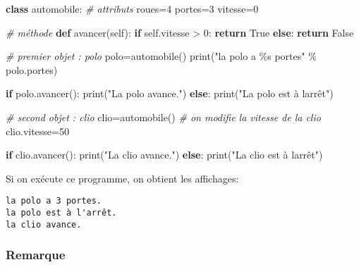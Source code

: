\documentclass[11pt]{article}
\newenvironment{Shaded}{}{}
\newcommand{\KeywordTok}[1]{\textcolor[rgb]{0.00,0.44,0.13}{\textbf{{#1}}}}
\newcommand{\DecValTok}[1]{\textcolor[rgb]{0.25,0.63,0.44}{{#1}}}
\newcommand{\StringTok}[1]{\textcolor[rgb]{0.25,0.44,0.63}{{#1}}}
\newcommand{\CommentTok}[1]{\textcolor[rgb]{0.38,0.63,0.69}{\textit{{#1}}}}
\newcommand{\NormalTok}[1]{{#1}}
\newcommand{\SpecialCharTok}[1]{\textcolor[rgb]{0.25,0.44,0.63}{{#1}}}
\newcommand{\VariableTok}[1]{\textcolor[rgb]{0.10,0.09,0.49}{{#1}}}
\newcommand{\ControlFlowTok}[1]{\textcolor[rgb]{0.00,0.44,0.13}{\textbf{{#1}}}}
\newcommand{\OperatorTok}[1]{\textcolor[rgb]{0.40,0.40,0.40}{{#1}}}
\newcommand{\BuiltInTok}[1]{{#1}}
\begin{document}
\begin{Shaded}
\begin{Highlighting}[]
\KeywordTok{class}\NormalTok{ automobile:}
    \CommentTok{\# attributs}
\NormalTok{    roues}\OperatorTok{=}\DecValTok{4}
\NormalTok{    portes}\OperatorTok{=}\DecValTok{3}
\NormalTok{    vitesse}\OperatorTok{=}\DecValTok{0}
    
    \CommentTok{\# méthode}
    \KeywordTok{def}\NormalTok{ avancer(}\VariableTok{self}\NormalTok{):}
        \ControlFlowTok{if} \VariableTok{self}\NormalTok{.vitesse }\OperatorTok{\textgreater{}} \DecValTok{0}\NormalTok{:}
            \ControlFlowTok{return} \VariableTok{True}
        \ControlFlowTok{else}\NormalTok{:}
            \ControlFlowTok{return} \VariableTok{False}

\CommentTok{\# premier objet : polo}
\NormalTok{polo}\OperatorTok{=}\NormalTok{automobile()}
\BuiltInTok{print}\NormalTok{(}\StringTok{"la polo a }\SpecialCharTok{\%s}\StringTok{ portes"} \OperatorTok{\%}\NormalTok{ polo.portes)}

\ControlFlowTok{if}\NormalTok{ polo.avancer():}
    \BuiltInTok{print}\NormalTok{(}\StringTok{"La polo avance."}\NormalTok{)}
\ControlFlowTok{else}\NormalTok{:}
    \BuiltInTok{print}\NormalTok{(}\StringTok{"La polo est à l\textquotesingle{}arrêt"}\NormalTok{)}

\CommentTok{\# second objet : clio}
\NormalTok{clio}\OperatorTok{=}\NormalTok{automobile()}
\CommentTok{\# on modifie la vitesse de la clio}
\NormalTok{clio.vitesse}\OperatorTok{=}\DecValTok{50}

\ControlFlowTok{if}\NormalTok{ clio.avancer():}
    \BuiltInTok{print}\NormalTok{(}\StringTok{"La clio avance."}\NormalTok{)}
\ControlFlowTok{else}\NormalTok{:}
    \BuiltInTok{print}\NormalTok{(}\StringTok{"La clio est à l\textquotesingle{}arrêt"}\NormalTok{)}
\end{Highlighting}
\end{Shaded}

Si on exécute ce programme, on obtient les affichages:

\begin{verbatim}
la polo a 3 portes.
la polo est à l'arrêt.
la clio avance.
\end{verbatim}

\hypertarget{remarque}{%
\subsubsection*{Remarque}\label{remarque}}
\end{document}
